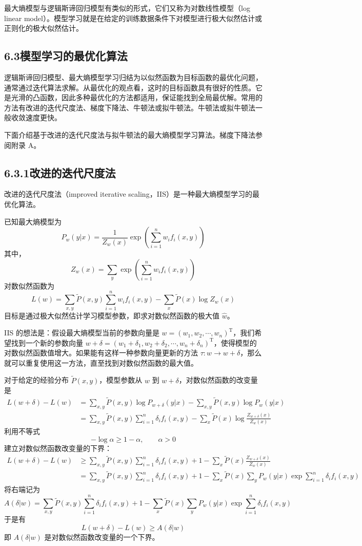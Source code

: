\documentclass[UTF8,12pt,a4paper,fontset=fandol]{ctexart}
\begin{document}
最大熵模型与逻辑斯谛回归模型有类似的形式，它们又称为对数线性模型（log linear model）。模型学习就是在给定的训练数据条件下对模型进行极大似然估计或正则化的极大似然估计。

\subsection*{6.3\quad 模型学习的最优化算法}

逻辑斯谛回归模型、最大熵模型学习归结为以似然函数为目标函数的最优化问题，通常通过迭代算法求解。从最优化的观点看，这时的目标函数具有很好的性质。它是光滑的凸函数，因此多种最优化的方法都适用，保证能找到全局最优解。常用的方法有改进的迭代尺度法、梯度下降法、牛顿法或拟牛顿法。牛顿法或拟牛顿法一般收敛速度更快。

下面介绍基于改进的迭代尺度法与拟牛顿法的最大熵模型学习算法。梯度下降法参阅附录 A。

\subsection*{6.3.1\quad 改进的迭代尺度法}

改进的迭代尺度法（improved iterative scaling，IIS）是一种最大熵模型学习的最优化算法。

已知最大熵模型为
\[
P_w(y|x)=\frac{1}{Z_w(x)}\exp\left(\sum_{i=1}^n w_i f_i(x,y)\right)
\]
其中，
\[
Z_w(x)=\sum_y\exp\left(\sum_{i=1}^n w_i f_i(x,y)\right)
\]
对数似然函数为
\[
L(w)=\sum_{x,y}\tilde{P}(x,y)\sum_{i=1}^n w_i f_i(x,y)-\sum_x\tilde{P}(x)\log Z_w(x)
\]
目标是通过极大似然估计学习模型参数，即求对数似然函数的极大值 $\hat{w}$。

IIS 的想法是：假设最大熵模型当前的参数向量是 $w=(w_1,w_2,\cdots,w_n)^{\mathrm{T}}$，我们希望找到一个新的参数向量 $w+\delta=(w_1+\delta_1,w_2+\delta_2,\cdots,w_n+\delta_n)^{\mathrm{T}}$，使得模型的对数似然函数值增大。如果能有这样一种参数向量更新的方法 $\tau:w\to w+\delta$，那么就可以重复使用这一方法，直至找到对数似然函数的最大值。

对于给定的经验分布 $\tilde{P}(x,y)$，模型参数从 $w$ 到 $w+\delta$，对数似然函数的改变量是
\[
\begin{aligned}
L(w+\delta)-L(w)
&=\sum_{x,y}\tilde{P}(x,y)\log P_{w+\delta}(y|x)-\sum_{x,y}\tilde{P}(x,y)\log P_w(y|x)\\
&=\sum_{x,y}\tilde{P}(x,y)\sum_{i=1}^n\delta_i f_i(x,y)-\sum_x\tilde{P}(x)\log\frac{Z_{w+\delta}(x)}{Z_w(x)}
\end{aligned}
\]
利用不等式
\[
-\log\alpha\geq 1-\alpha,\qquad \alpha>0
\]
建立对数似然函数改变量的下界：
\[
\begin{aligned}
L(w+\delta)-L(w)
&\geq \sum_{x,y}\tilde{P}(x,y)\sum_{i=1}^n\delta_i f_i(x,y)+1-\sum_x\tilde{P}(x)\frac{Z_{w+\delta}(x)}{Z_w(x)}\\
&=\sum_{x,y}\tilde{P}(x,y)\sum_{i=1}^n\delta_i f_i(x,y)+1
-\sum_x\tilde{P}(x)\sum_y P_w(y|x)\exp\sum_{i=1}^n\delta_i f_i(x,y)
\end{aligned}
\]
将右端记为
\[
A(\delta|w)=\sum_{x,y}\tilde{P}(x,y)\sum_{i=1}^n\delta_i f_i(x,y)+1
-\sum_x\tilde{P}(x)\sum_y P_w(y|x)\exp\sum_{i=1}^n\delta_i f_i(x,y)
\]
于是有
\[
L(w+\delta)-L(w)\geq A(\delta|w)
\]
即 $A(\delta|w)$ 是对数似然函数改变量的一个下界。
\end{document}
